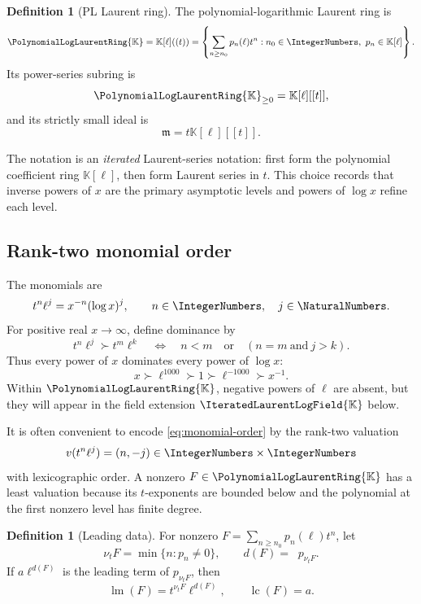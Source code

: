 \documentclass[11pt,oneside]{article}
\numberwithin{equation}{section}
\theoremstyle{definition}
\newtheorem{definition}[theorem]{Definition}
\newcommand{\K}{\mathbb{K}}
\newcommand{\PL}{\PolynomialLogLaurentRing{\K}}
\newcommand{\HL}{\IteratedLaurentLogField{\K}}
\newcommand{\ordx}{\nu_t}
\newcommand{\lc}{\operatorname{lc}}
\newcommand{\LeadingMonomialOf}[1]{\operatorname{lm}\!\left(#1\right)}
\DeclareMathOperator{\degell}{deg_{\ell}}
\begin{document}
\begin{definition}[PL Laurent ring]
The polynomial-logarithmic Laurent ring is
\begin{equation}\label{eq:PL-ring}
  \PL=\K[\ell]((t))
  =\left\{\sum_{n\ge n_0}p_n(\ell)t^n:
      n_0\in\IntegerNumbers,\ p_n\in\K[\ell]\right\}.
\end{equation}
Its power-series subring is
\[
  \PL_{\ge0}=\K[\ell][[t]],
\]
and its strictly small ideal is
\[
  \mathfrak m=t\K[\ell][[t]].
\]
\end{definition}

The notation is an \emph{iterated} Laurent-series notation: first form the
polynomial coefficient ring \(\K[\ell]\), then form Laurent series in \(t\).
This choice records that inverse powers of \(x\) are the primary asymptotic
levels and powers of \(\log x\) refine each level.

\subsection{Rank-two monomial order}

The monomials are
\[
  t^n\ell^j=x^{-n}(\log x)^j,
  \qquad n\in\IntegerNumbers,\quad j\in\NaturalNumbers.
\]
For positive real \(x\to\infty\), define dominance by
\begin{equation}\label{eq:monomial-order}
  t^n\ell^j\succ t^m\ell^k
  \quad\Longleftrightarrow\quad
  n<m\quad\text{or}\quad(n=m\ \text{and}\ j>k).
\end{equation}
Thus every power of \(x\) dominates every power of \(\log x\):
\[
  x\succ \ell^{1000}\succ1\succ \ell^{-1000}\succ x^{-1}.
\]
Within \(\PL\), negative powers of \(\ell\) are absent, but they will appear in
the field extension \(\HL\) below.

It is often convenient to encode \eqref{eq:monomial-order} by the rank-two
valuation
\begin{equation}\label{eq:valuation-pair}
  v(t^n\ell^j)=(n,-j)\in\IntegerNumbers\times\IntegerNumbers
\end{equation}
with lexicographic order.  A nonzero \(F\in\PL\) has a least valuation because
its \(t\)-exponents are bounded below and the polynomial at the first nonzero
level has finite degree.

\begin{definition}[Leading data]
For nonzero
\(F=\sum_{n\ge n_0}p_n(\ell)t^n\), let
\[
  \ordx F=\min\{n:p_n\ne0\},\qquad
  d(F)=\degell p_{\ordx F}.
\]
If \(a\ell^{d(F)}\) is the leading term of
\(p_{\ordx F}\), then
\[
  \LeadingMonomialOf{F}=t^{\ordx F}\ell^{d(F)},\qquad
  \lc(F)=a.
\]
\end{definition}
\end{document}
